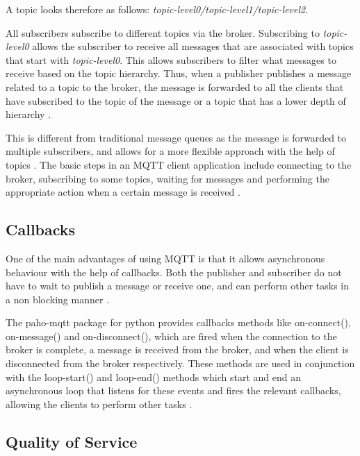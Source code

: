 \documentclass[sigconf]{acmart}
\begin{document}
A topic looks therefore as follows: {\em topic-level0/topic-level1/topic-level2}.


%
%


All subscribers subscribe to different topics via the broker.
Subscribing to {\em topic-level0} allows the subscriber to receive all
messages that are associated with topics that start with {\em
  topic-level0}. This allows subscribers to filter what messages to
receive based on the topic hierarchy. Thus, when a publisher publishes
a message related to a topic to the broker, the message is forwarded
to all the clients that have subscribed to the topic of the message or
a topic that has a lower depth of hierarchy \cite{hivemq-details}
\cite{how-mqtt-works}.

This is different from traditional message queues as the message is
forwarded to multiple subscribers, and allows for a more flexible
approach with the help of topics \cite{hivemq-details}. The basic
steps in an MQTT client application include connecting to the broker,
subscribing to some topics, waiting for messages and performing the
appropriate action when a certain message is received
\cite{mqtt-wiki}.
 
\subsection{Callbacks}

One of the main advantages of using MQTT is that it allows
asynchronous behaviour with the help of callbacks. Both the publisher
and subscriber do not have to wait to publish a message or receive
one, and can perform other tasks in a non blocking manner
\cite{hivemq-details} \cite{python-paho-mqtt}.

The paho-mqtt package for python provides callbacks methods like
on-connect(), on-message() and on-disconnect(), which are fired when
the connection to the broker is complete, a message is received from
the broker, and when the client is disconnected from the broker
respectively. These methods are used in conjunction with the
loop-start() and loop-end() methods which start and end an
asynchronous loop that listens for these events and fires the relevant
callbacks, allowing the clients to perform other tasks
\cite{python-paho-mqtt}.

\subsection{Quality of Service}
\end{document}
